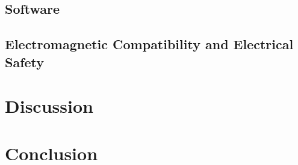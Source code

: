 \documentclass{article}
\begin{document}
\subsection{Software}
\subsection{Electromagnetic Compatibility and Electrical Safety}

\section{Discussion}
\label{sec:discussion}

\section{Conclusion}
\label{sec:conclusion}


\newpage
{}


\end{document}
